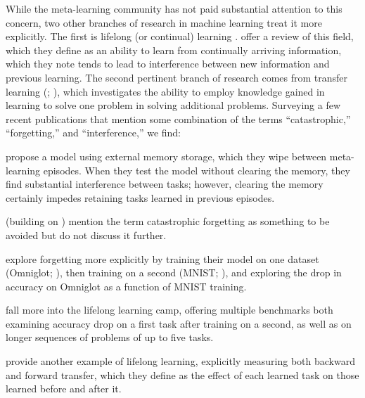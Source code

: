 While the meta-learning community has not paid substantial attention to this concern, two other branches of research in machine learning treat it more explicitly. The first is lifelong (or continual) learning \parencite{Thrun1995}. \textcite{Parisi2019} offer a review of this field, which they define as an ability to learn from continually arriving information, which they note tends to lead to interference between new information and previous learning. The second pertinent branch of research comes from transfer learning (\cite{Pratt1993}; \cite{Caruna1997}), which investigates the ability to employ knowledge gained in learning to solve one problem in solving additional problems. Surveying a few recent publications that mention some combination of the terms ``catastrophic,'' ``forgetting,'' and ``interference,'' we find:
\begin{tightemize}
\item \textcite{Santoro2016} propose a model using external memory storage, which they wipe between meta-learning episodes. When they test the model without clearing the memory, they find substantial interference between tasks; however, clearing the memory certainly impedes retaining tasks learned in previous episodes. 

\item \textcite{Al-Shedivat2018} (building on \cite{Finn2017}) mention the term catastrophic forgetting as something to be avoided but do not discuss it further.

\item \textcite{Munkhdalai2018} explore forgetting more explicitly by training their model on one dataset (Omniglot; \cite{Lake2015}), then training on a second (MNIST; \cite{Lecun1998}), and exploring the drop in accuracy on Omniglot as a function of MNIST training. 

\item \textcite{Aljundi2018} fall more into the lifelong learning camp, offering multiple benchmarks both examining accuracy drop on a first task after training on a second, as well as on longer sequences of problems of up to five tasks.

\item \textcite{Lopez-Paz2017} provide another example of lifelong learning, explicitly measuring both backward and forward transfer, which they define as the effect of each learned task on those learned before and after it.
\end{tightemize}

